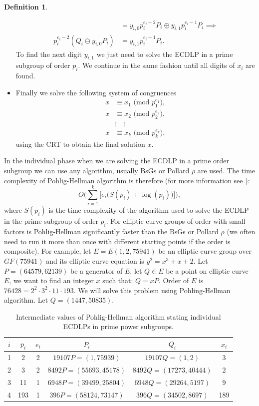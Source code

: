 \documentclass[thesis=M,english]{FITthesis}[2012/10/20]
\theoremstyle{remark}
\theoremstyle{definition}
\newtheorem{DF}{Definition}[section]
\begin{document}
\begin{DF}
\begin{itemize}
\begin{align*}
&= y_{i,0}p_i^{e_i-2}P_i \oplus y_{i,1}p_i^{e_i-1}P_i \implies \\
p_i^{e_i-2}(Q_i \ominus y_{i,0}P_i) &= y_{i,1}p_i^{e_i-1}P_i.
\end{align*}
To find the next digit $y_{i,1}$ we just need to solve the ECDLP in a prime subgroup of order $p_i$. We continue in the same fashion until all digits of $x_i$ are found.
\item Finally we solve the following system of congruences
\begin{align*}
x &\equiv x_1 \text{ (mod $p_1^{e_1}$)}, \\
x &\equiv x_2 \text{ (mod $p_2^{e_2}$)}, \\
&\vdots \quad \vdots \\
x &\equiv x_k \text{ (mod $p_k^{e_k}$)},
\end{align*}
using the CRT to obtain the final solution $x$.
\end{itemize}
\end{DF}
In the individual phase when we are solving the ECDLP in a prime order subgroup we can use any algorithm, usually BsGs or Pollard $\rho$ are used. The time complexity of Pohlig-Hellman algorithm is therefore (for more information see \cite{mky}):
$$
O\bigg(\sum_{i=1}^k\bigg[e_i\big(S(p_i) + \log(p_i)\big)\bigg]\bigg),
$$ where $S(p_i)$ is the time complexity of the algorithm used to solve the ECDLP in the prime subgroup of order $p_i$. For elliptic curve groups of order with small factors is Pohlig-Hellman significantly faster than the BsGs or Pollard $\rho$ (we often need to run it more than once with different starting points if the order is composite).
\noindent For example, let $E = E(1,2,75941)$ be an elliptic curve group over $GF(75941)$ and its elliptic curve equation is $y^2 = x^3 + x + 2$. Let $P = (64579,62139)$ be a generator of $E$, let $Q \in E$ be a point on elliptic curve $E$, we want to find an integer $x$ such that: $Q = xP.$ Order of $E$ is $76428 = 2^2\cdot 3^2\cdot 11 \cdot 193$. We will solve this problem using Pohling-Hellman algorithm. Let $Q = (1447, 50835)$.
\begin{table}[!h]
\centering
\begin{tabular}{ |c||c|c|c|c|c| } 
\hline
 $i$ & $p_i$ & $e_i$ & $P_i$ & $Q_i$ & $x_i$  \\
\hline
\hline
1 & 2 & 2 & $19107P = (1, 75939)$ &  $19107Q = (1,2)$ & 3  \\ \hline
2 & 3 & 2 & $8492P = (55693, 45178)$ &  $8492Q = (17273,40444)$ & 2 \\ \hline
3 & 11 & 1 & $6948P = (39499, 25804)$ &  $6948Q = (29264,5197)$ & 9 \\  \hline
4 & 193 & 1 & $396P = (58124, 73147)$ &  $396Q = (34502,8697)$ & 189 \\ \hline
\end{tabular}
\caption{Intermediate values of Pohlig-Hellman algorithm stating individual ECDLPs in prime power subgroups.}
\label{tblPH}
\end{table}
\end{document}
